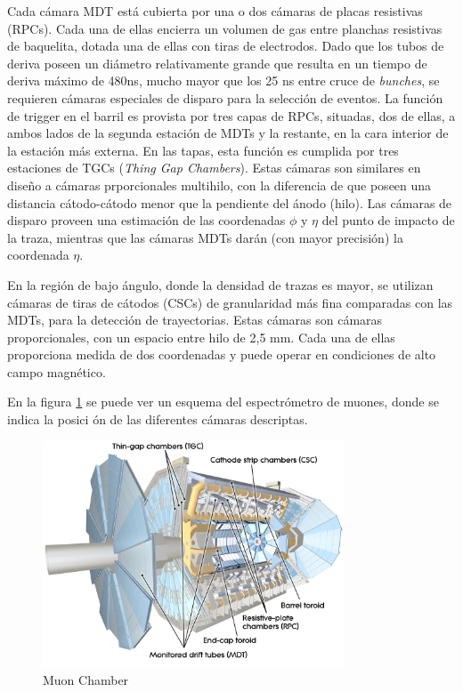    Cada c\'amara MDT est\'a cubierta por una o dos c\'amaras de placas resistivas (RPCs). Cada una de ellas encierra un volumen de gas entre planchas resistivas de baquelita, dotada una de ellas con tiras de electrodos. Dado que los tubos de deriva poseen un di\'ametro relativamente grande que resulta en un tiempo de deriva m\'aximo de 480ns, mucho mayor que los 25 ns entre cruce de \emph{bunches}, se requieren c\'amaras especiales de disparo para la selecci\'on de eventos. La funci\'on de trigger en el barril es provista por tres capas de RPCs, situadas, dos de ellas, a ambos lados de la segunda estaci\'on de MDTs y la restante, en la cara interior de la estaci\'on m\'as externa. 
En las tapas, esta funci\'on es cumplida por tres estaciones de TGCs (\emph{Thing Gap Chambers}). Estas c\'amaras son similares en dise\~no a c\'amaras prporcionales multihilo, con la diferencia de que poseen una distancia c\'atodo-c\'atodo menor que la pendiente del \'anodo (hilo). 
   Las c\'amaras de disparo proveen una estimaci\'on de las coordenadas $\phi$ y $\eta$ del punto de impacto de la traza, mientras que las c\'amaras MDTs dar\'an (con mayor precisi\'on) la coordenada $\eta$.

    En la regi\'on de bajo \'angulo, donde la densidad de trazas es mayor, se utilizan c\'amaras de tiras de c\'atodos (CSCs) de granularidad m\'as fina comparadas con las MDTs, para la detecci\'on de trayectorias. Estas c\'amaras son c\'amaras proporcionales, con un espacio entre hilo de 2,5 mm. Cada una de ellas proporciona medida de dos coordenadas y puede operar en condiciones de alto campo magn\'etico.

   En la figura \ref{fig:MUON1} se puede ver un esquema del espectr\'ometro de muones, donde se indica la posici \'on de las diferentes c\'amaras descriptas.

\begin{figure}[htbp]
  \begin{center}
      \includegraphics[width=0.8\textwidth]{Fig2/MuonChamber.pdf}
    \caption{Muon Chamber}
    \label{fig:MUON1}
  \end{center}
\end{figure}



